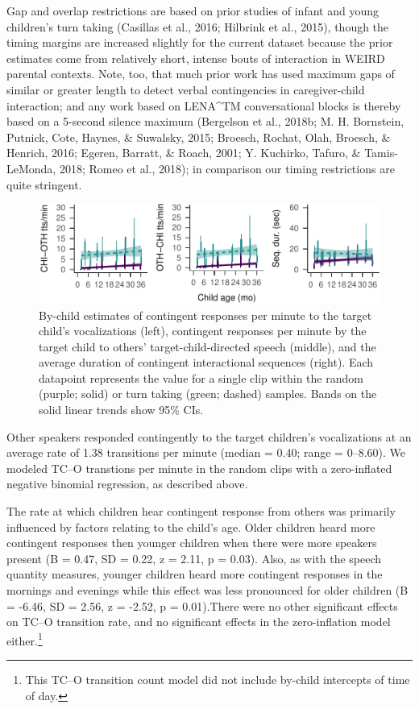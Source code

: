 \documentclass[floatsintext,man]{apa6}
\theoremstyle{definition}
\theoremstyle{definition}
\theoremstyle{definition}
\theoremstyle{remark}
\begin{document}
Gap and overlap restrictions are based on prior studies of infant and
young children's turn taking (Casillas et al., 2016; Hilbrink et al.,
2015), though the timing margins are increased slightly for the current
dataset because the prior estimates come from relatively short, intense
bouts of interaction in WEIRD parental contexts. Note, too, that much
prior work has used maximum gaps of similar or greater length to detect
verbal contingencies in caregiver-child interaction; and any work based
on LENA\^{}TM conversational blocks is thereby based on a 5-second
silence maximum (Bergelson et al., 2018b; M. H. Bornstein, Putnick,
Cote, Haynes, \& Suwalsky, 2015; Broesch, Rochat, Olah, Broesch, \&
Henrich, 2016; Egeren, Barratt, \& Roach, 2001; Y. Kuchirko, Tafuro, \&
Tamis-LeMonda, 2018; Romeo et al., 2018); in comparison our timing
restrictions are quite stringent.

\begin{figure}
\centering
\includegraphics{Tseltal-CLE_files/figure-latex/fig7-1.pdf}
\caption{\label{fig:fig7}By-child estimates of contingent responses per
minute to the target child's vocalizations (left), contingent responses
per minute by the target child to others' target-child-directed speech
(middle), and the average duration of contingent interactional sequences
(right). Each datapoint represents the value for a single clip within
the random (purple; solid) or turn taking (green; dashed) samples. Bands
on the solid linear trends show 95\% CIs.}
\end{figure}

Other speakers responded contingently to the target children's
vocalizations at an average rate of 1.38 transitions per minute (median
= 0.40; range = 0--8.60). We modeled TC--O transtions per minute in the
random clips with a zero-inflated negative binomial regression, as
described above.

The rate at which children hear contingent response from others was
primarily influenced by factors relating to the child's age. Older
children heard more contingent responses then younger children when
there were more speakers present (B = 0.47, SD = 0.22, z = 2.11, p =
0.03). Also, as with the speech quantity measures, younger children
heard more contingent responses in the mornings and evenings while this
effect was less pronounced for older children (B = -6.46, SD = 2.56, z =
-2.52, p = 0.01).There were no other significant effects on TC--O
transition rate, and no significant effects in the zero-inflation model
either.\footnote{This TC--O transition count model did not include
  by-child intercepts of time of day.}
\end{document}
